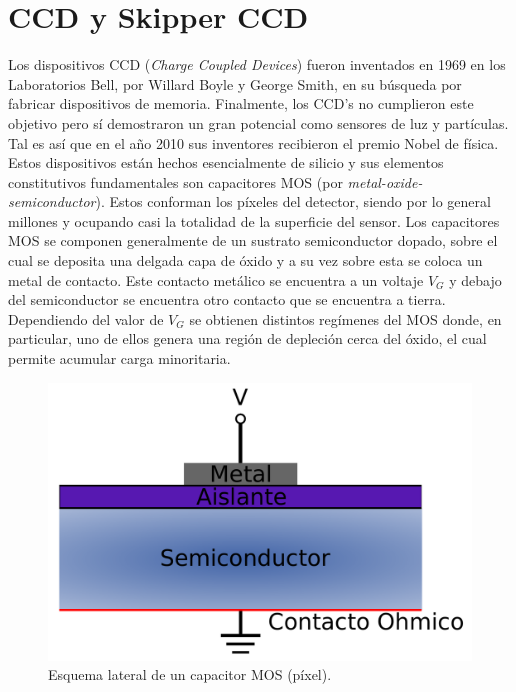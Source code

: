 \section{CCD y Skipper CCD}
\noindent Los dispositivos CCD (\textit{Charge Coupled Devices}) fueron inventados en 1969 en los Laboratorios Bell, por Willard Boyle y George Smith, en su búsqueda por fabricar dispositivos de memoria. Finalmente, los CCD's no cumplieron este objetivo pero sí demostraron un gran potencial como sensores de luz y partículas. Tal es así que en el año 2010 sus inventores recibieron el premio Nobel de física\cite{Boyle, Smith}.\\
\indent Estos dispositivos están hechos esencialmente de silicio y sus elementos constitutivos fundamentales son capacitores MOS (por \textit{metal-oxide-semiconductor}). Estos conforman los píxeles del detector, siendo por lo general millones y ocupando casi la totalidad de la superficie del sensor. Los capacitores MOS se componen generalmente de un sustrato semiconductor dopado, sobre el cual se deposita una delgada capa de óxido y a su vez sobre esta se coloca un metal de contacto. Este contacto metálico se encuentra a un voltaje $V_{G}$ y debajo del semiconductor se encuentra otro contacto que se encuentra a tierra. Dependiendo del valor de $V_{G}$ se obtienen distintos regímenes del MOS\cite{Chenming} donde, en particular, uno de ellos genera una región de depleción cerca del óxido, el cual permite acumular carga minoritaria.\\
\begin{figure}%
    \centering
        \includegraphics[scale=.35]{Figs/PixelCrossSection.pdf}
    \caption{\footnotesize{Esquema lateral de un capacitor MOS (píxel).}}
    \label{fig:PixelCrossSection}
\end{figure}
